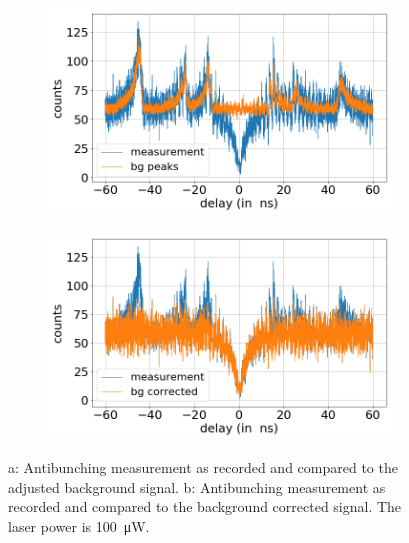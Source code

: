 \begin{figure}[H]
    \centering
    \begin{subfigure}{0.47\textwidth}
        \centering
        \includegraphics[width=1.0\textwidth]{img/output_t2/100.0muW_bg_peaks.png}
    \caption{}
    \end{subfigure}
    \begin{subfigure}{0.47\textwidth}
        \centering
        \includegraphics[width=\textwidth]{img/output_t2/100.0muW_bg_vgl.png}
        \caption{}
    \end{subfigure}
    \caption{a: Antibunching measurement as recorded and compared to the adjusted background signal. b: Antibunching measurement as recorded and compared to the background corrected signal. The laser power is \SI{100}{\micro W}.} %
\end{figure}
